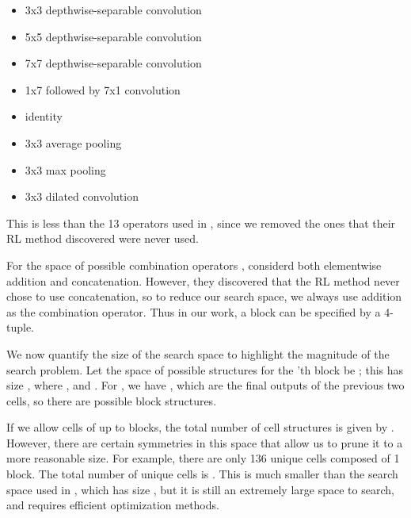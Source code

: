 \documentclass[runningheads]{llncs}
\begin{document}
\begin{minipage}{0.5\textwidth}
\renewcommand\labelitemi{}
\footnotesize
\bigbreak
\begin{itemize}
\item 3x3 depthwise-separable convolution
\item 5x5 depthwise-separable convolution
\item 7x7 depthwise-separable convolution
\item 1x7 followed by 7x1 convolution
\end{itemize}
\bigbreak
\end{minipage}
\begin{minipage}{0.5\textwidth}
\renewcommand\labelitemi{}
\footnotesize
\bigbreak
\begin{itemize}
\item identity
\item 3x3 average pooling
\item 3x3 max pooling
\item 3x3 dilated convolution
\end{itemize}
\bigbreak
\end{minipage}
This is less than the 13 operators used in \cite{DBLP:journals/corr/ZophVSL17},
since 
we removed the ones that their RL method discovered were never used.
 
For the space of possible combination operators ,
 \cite{DBLP:journals/corr/ZophVSL17} considerd both
 elementwise addition and concatenation.
However, they discovered that the RL method never chose to use concatenation,
so to reduce our search space, we always use addition as the combination operator.
Thus in our work, a block can be specified by a 4-tuple.


We now quantify the size of the search space to highlight the magnitude of the search problem. 
Let the space of possible structures for the 'th block
be ;
this has size
,
where 
,
 and .
For , we have 
,
which 
are the final outputs of the previous two cells,
so there are  possible block structures. 


If we allow cells of up to  blocks,
the total number of cell structures
is given by
. 
However, there are certain symmetries in this space that allow us to prune it
to a more reasonable size.
For example, there are only 136 unique cells composed of 1 block.
The total number of unique cells is .
This is much smaller than the search space used in 
 \cite{DBLP:journals/corr/ZophVSL17}, which has size
 ,
but it is still an extremely large space to search, and requires efficient 
optimization methods.
\end{document}
